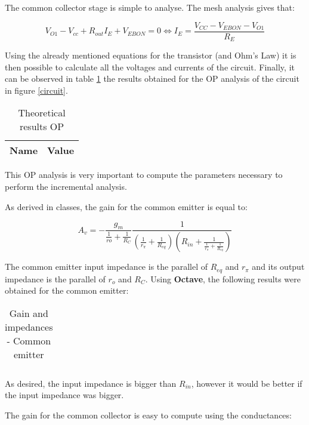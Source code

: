 The common collector stage is simple to analyse. The mesh analysis gives that:

\begin{equation}
        V_{O1}-V_{cc}+R_{out}I_E+V_{EBON} = 0 \iff I_E = \frac{V_{CC}-V_{EBON}-V_{O1}}{R_E}
\end{equation}

Using the already mentioned equations for the transistor (and Ohm's Law) it is then possible to calculate all the voltages and currents of the circuit. Finally, it can be observed in table \ref{opteorico} the results obtained for the OP analysis of the circuit in figure \ref{circuit}.

\begin{table}[H]
  \centering
  \begin{tabular}{|c|c|}
    \hline
        {\bf Name} & {\bf Value} \\
        \hline
        \hline
        
        \hline
  \end{tabular}
  \caption{Theoretical results OP}
  \label{opteorico}
\end{table}

This OP analysis is very important to compute the parameters necessary to perform the incremental analysis.

As derived in classes, the gain for the common emitter is equal to:

\begin{equation}
        A_v = -\frac{g_m}{\frac{1}{ro}+\frac{1}{R_C}}\frac{1}{(\frac{1}{r_{\pi}}+\frac{1}{R_{eq}})(R_{in}+\frac{1}{\frac{1}{r_{\pi}}+\frac{1}{R_{eq}}})}
\end{equation}

The common emitter input impedance is the parallel of $R_{eq}$ and $r_{\pi}$ and its output impedance is the parallel of $r_o$ and $R_C$. Using {\bf Octave}, the following results were obtained for the common emitter:

\begin{table}[H]
  \centering
  \begin{tabular}{|c|c|}
    \hline
        
        \hline
  \end{tabular}
  \caption{Gain and impedances - Common emitter}
  \label{gainemitter}
\end{table}

As desired, the input impedance is bigger than $R_{in}$, however it would be better if the input impedance was bigger.

The gain for the common collector is easy to compute using the conductances:

